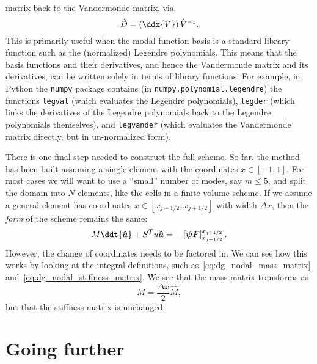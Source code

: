 matrix back to the Vandermonde matrix, via
%
\begin{equation}
  \label{eq:dg_nodal_D_matrix_from_V}
  \hat{D} = \left( \ddx{V} \right) \hat{V}^{-1}.
\end{equation}
%
This is primarily useful when the modal function basis is a standard library
function such as the (normalized) Legendre polynomials. This means that the
basis functions and their derivatives, and hence the Vandermonde matrix and its
derivatives, can be written solely in terms of library functions. For example,
in Python the \texttt{numpy} package contains (in \texttt{numpy.polynomial.legendre})
the functions \texttt{legval} (which evaluates the Legendre polynomials),
\texttt{legder} (which links the derivatives of the Legendre polynomials back to
the Legendre polynomials themselves), and \texttt{legvander} (which evaluates
the Vandermonde matrix directly, but in un-normalized form).

There is one final step needed to construct the full scheme. So far, the method
has been built assuming a single element with the coordinates $x \in [-1, 1]$.
For most cases we will want to use a ``small'' number of modes, say $m \le 5$,
and split the domain into $N$ elements, like the cells in a finite volume scheme.
If we assume a general element has coordinates $x \in [x_{j-1/2}, x_{j+1/2}]$
with width $\Delta x$, then the \emph{form} of the scheme remains the same:
%
\begin{equation}
  \label{eq:dg_nodal_final}
  M \ddt{\bm{\hat{a}}} + S^T u \bm{\hat{a}} = -\left[ \bm{\psi F} \right]_{x_{j-1/2}}^{x_{j+1/2}}.
\end{equation}
%
However, the change of coordinates needs to be factored in. We can see how this
works by looking at the integral definitions, such as~\eqref{eq:dg_nodal_mass_matrix}
and~\eqref{eq:dg_nodal_stiffness_matrix}. We see that the mass matrix transforms
as
%
\begin{equation}
  \label{eq:dg_nodal_mass_matrix_with_h}
  M = \frac{\Delta x}{2} \hat{M},
\end{equation}
%
but that the stiffness matrix is unchanged.


\section{Going further}

